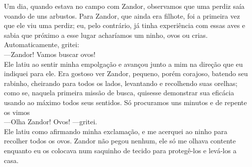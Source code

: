 Um dia, quando estava no campo com Zandor, observamos que uma perdiz saía voando de uns arbustos. 
Para Zandor, que ainda era filhote, foi a primeira vez que ele viu uma perdiz; 
eu, pelo contrário, já tinha experiência com essas aves e sabia que próximo a esse lugar acharíamos um ninho, ovos ou crias. 
Automaticamente, gritei:\\\indent
---Zandor! Vamos buscar ovos!\\\indent
Ele latiu ao sentir minha empolgação e avançou junto a mim na direção que eu indiquei para ele. 
Era gostoso ver Zandor, pequeno, porém corajoso, batendo seu rabinho, cheirando para todos os lados, levantando e recolhendo suas orelhas; como se, naquela primeira missão de busca, quisesse demonstrar sua eficácia usando ao máximo todos seus sentidos. 
Só procuramos uns minutos e de repente os vimos\\\indent
---Olha Zandor! Ovos! ---gritei.\\\indent
Ele latiu como afirmando minha exclamação, e me acerquei ao ninho para recolher todos os ovos. Zandor não pegou nenhum, ele só me olhava contente enquanto eu os colocava num saquinho de tecido para protegê-los e levá-los a casa. 

